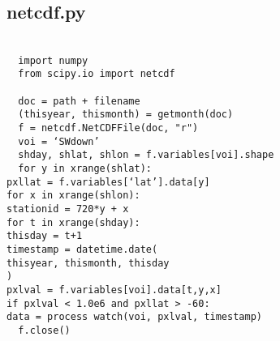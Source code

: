 \subsection{netcdf.py}
\label{app:netcdfpy}
\texttt{ \\
~~import numpy\\
~~from scipy.io import netcdf\\
~~\\
~~doc = path + filename\\
~~(thisyear, thismonth) = get\textunderscore month(doc)\\
~~f = netcdf.NetCDFFile(doc, "r")\\
~~voi = `SWdown'\\
~~sh\textunderscore day, sh\textunderscore lat, 
              sh\textunderscore lon = f.variables[voi].shape\\
~~for y in xrange(sh\textunderscore lat):\\
 \indent pxl\textunderscore lat = f.variables[`lat'].data[y]\\
 \indent for x in xrange(sh\textunderscore lon):\\
 \indent \indent stationid = 720*y + x\\
 \indent \indent for t in xrange(sh\textunderscore day):\\
 \indent \indent \indent thisday = t+1\\
 \indent \indent \indent timestamp = datetime.date(\\
 \indent \indent \indent \indent thisyear, thismonth, thisday\\
 \indent \indent \indent \indent )\\
 \indent \indent \indent pxl\textunderscore val = 
                                     f.variables[voi].data[t,y,x]\\
 \indent \indent \indent if pxl\textunderscore val < 1.0e6 and 
                                     pxl\textunderscore lat > -60:\\
 \indent \indent \indent \indent data = process\textunderscore 
                                             watch(voi, pxl\textunderscore val, 
                                             timestamp)\\
~~f.close()\\
}

